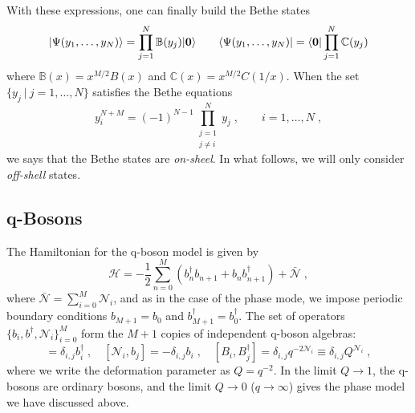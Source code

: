 \documentclass[a4paper,11pt]{amsart}
\begin{document}
With these expressions, one can finally build the Bethe states
\begin{equation}
  \lvert\Psi(y_1, \dots, y_N)\rangle = \prod_{j=1}^N \mathbb{B}(y_j) \lvert\bm{0}\rangle \qquad 
  \langle\Psi(y_1, \dots, y_N)\rvert = \langle\bm{0}\rvert\prod_{j=1}^N \mathbb{C}(y_j) 
\end{equation}
where \(\mathbb{B}(x) = x^{M/2} B(x)\) and \(\mathbb{C}(x) = x^{M/2} C(1/x)\).
When the set \(\{ y_j \ | \ j
=1, \dots , N\}\) satisfies the Bethe equations
\begin{equation}
\label{eq:bethe_eq}
  y^{N + M}_i = (-1)^{N-1} \prod_{\substack{j = 1 \\ j \neq i}}^N y_j\; , \qquad i = 1, \dots, N\; , 
\end{equation}
we says that the Bethe states are \emph{on-sheel}. In what follows, we will 
only consider \emph{off-shell} states. 


\subsection{q-Bosons}
The Hamiltonian for the q-boson model is
given by
\begin{equation}
  \mathcal{H} = -\frac{1}{2} \sum_{n=0}^M
  \left(b_n^\dagger b_{n+1} + b_n b_{n+1}^\dagger \right) + \bar{\mathcal{N}}\; ,
\end{equation}
where \(\bar{\mathcal{N}} = \sum_{i=0}^M \mathcal{N}_i\), and as in
the case of the phase mode, we impose periodic boundary conditions
\(b_{M+1} = b_0\) and \(b_{M+1}^\dagger = b_0^\dagger\). The set of
operators \(\{b_i, b^\dagger,\mathcal{N}_i\}_{i=0}^M\) form the
\(M+1\) copies of independent q-boson algebras:
\begin{equation}
[\mathcal{N}_i, b_j^\dagger]=\delta_{i,j} b_i^\dagger\; , \quad 
[\mathcal{N}_i, b_j]=-\delta_{i,j}b_i\; , \quad
[B_i, B_j^\dagger]= \delta_{i,j} q^{-2\mathcal{N}_i}  \equiv \delta_{i,j} Q^{\mathcal{N}_i}\; , 
\end{equation}
where we write the deformation parameter as \(Q = q^{-2}\). 
In the limit \(Q\to 1\), the q-bosons are ordinary bosons, and 
the limit \(Q\to 0\) (\(q\to \infty\)) gives the phase model we have discussed above. 
\end{document}
